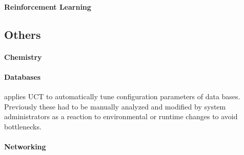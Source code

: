 \paragraph{Reinforcement Learning}
\subsection{Others}
\paragraph{Chemistry}
\cite{yang2019concepts}
\paragraph{Databases}
\cite{omondi2019monte} applies UCT to automatically tune configuration parameters of data bases. Previously these had to be manually analyzed and modified by system administrators as a reaction to environmental or runtime changes to avoid bottlenecks. 
\paragraph{Networking}
\cite{haeri2017virtual}